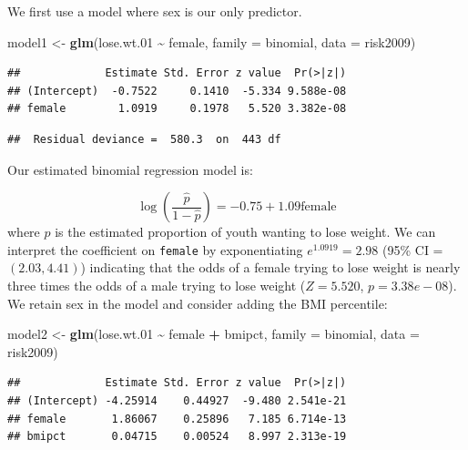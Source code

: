 \documentclass[
]{krantz}
\newenvironment{Shaded}{\begin{snugshade}}{\end{snugshade}}
\newcommand{\AttributeTok}[1]{\textcolor[rgb]{0.27,0.27,0.27}{#1}}
\newcommand{\FloatTok}[1]{\textcolor[rgb]{0.06,0.06,0.06}{#1}}
\newcommand{\FunctionTok}[1]{\textcolor[rgb]{0.27,0.27,0.27}{\textbf{#1}}}
\newcommand{\NormalTok}[1]{#1}
\newcommand{\OtherTok}[1]{\textcolor[rgb]{0.37,0.37,0.37}{#1}}
\newcommand{\SpecialCharTok}[1]{\textcolor[rgb]{0.43,0.43,0.43}{\textbf{#1}}}
\begin{document}
We first use a model where sex is our only predictor.

\begin{Shaded}
\begin{Highlighting}[]
\NormalTok{model1 }\OtherTok{\textless{}{-}} \FunctionTok{glm}\NormalTok{(lose.wt}\FloatTok{.01} \SpecialCharTok{\textasciitilde{}}\NormalTok{ female, }\AttributeTok{family =}\NormalTok{ binomial, }
              \AttributeTok{data =}\NormalTok{ risk2009)}
\end{Highlighting}
\end{Shaded}

\begin{verbatim}
##             Estimate Std. Error z value  Pr(>|z|)
## (Intercept)  -0.7522     0.1410  -5.334 9.588e-08
## female        1.0919     0.1978   5.520 3.382e-08
\end{verbatim}

\begin{verbatim}
##  Residual deviance =  580.3  on  443 df
\end{verbatim}

Our estimated binomial regression model is:

\[\log\left(\frac{\hat{p}}{1-\hat{p}}\right)=-0.75+1.09 \textrm{female}\]
where \(\hat{p}\) is the estimated proportion of youth wanting to lose weight. We can interpret the coefficient on \texttt{female} by exponentiating \(e^{1.0919} = 2.98\) (95\% CI = \((2.03, 4.41)\)) indicating that the odds of a female trying to lose weight is nearly three times the odds of a male trying to lose weight (\(Z=5.520\), \(p=3.38e-08\)). We retain sex in the model and consider adding the BMI percentile:

\begin{Shaded}
\begin{Highlighting}[]
\NormalTok{model2 }\OtherTok{\textless{}{-}} \FunctionTok{glm}\NormalTok{(lose.wt}\FloatTok{.01} \SpecialCharTok{\textasciitilde{}}\NormalTok{ female }\SpecialCharTok{+}\NormalTok{ bmipct, }
              \AttributeTok{family =}\NormalTok{ binomial, }\AttributeTok{data =}\NormalTok{ risk2009)}
\end{Highlighting}
\end{Shaded}

\begin{verbatim}
##             Estimate Std. Error z value  Pr(>|z|)
## (Intercept) -4.25914    0.44927  -9.480 2.541e-21
## female       1.86067    0.25896   7.185 6.714e-13
## bmipct       0.04715    0.00524   8.997 2.313e-19
\end{verbatim}
\end{document}

